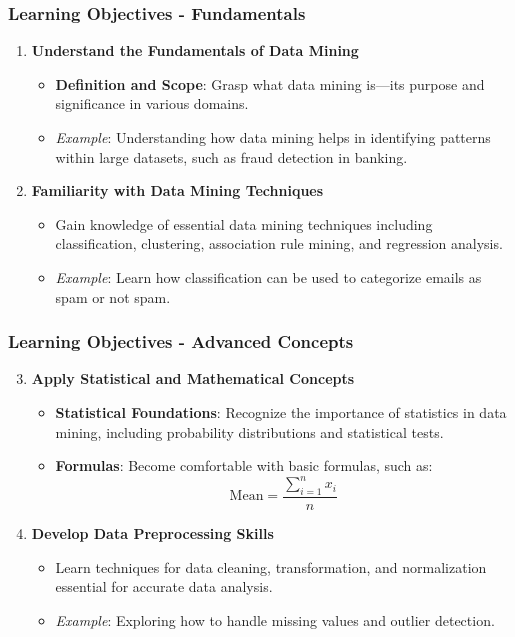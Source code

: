 \documentclass[aspectratio=169]{beamer}
\begin{document}
\begin{frame}[fragile]
    \frametitle{Learning Objectives - Fundamentals}
    \begin{enumerate}
        \item \textbf{Understand the Fundamentals of Data Mining}
        \begin{itemize}
            \item \textbf{Definition and Scope}: Grasp what data mining is—its purpose and significance in various domains.
            \item \textit{Example}: Understanding how data mining helps in identifying patterns within large datasets, such as fraud detection in banking.
        \end{itemize}
        
        \item \textbf{Familiarity with Data Mining Techniques}
        \begin{itemize}
            \item Gain knowledge of essential data mining techniques including classification, clustering, association rule mining, and regression analysis.
            \item \textit{Example}: Learn how classification can be used to categorize emails as spam or not spam.
        \end{itemize}
    \end{enumerate}
\end{frame}

\begin{frame}[fragile]
    \frametitle{Learning Objectives - Advanced Concepts}
    \begin{enumerate}
        \setcounter{enumi}{2} %
        \item \textbf{Apply Statistical and Mathematical Concepts}
        \begin{itemize}
            \item \textbf{Statistical Foundations}: Recognize the importance of statistics in data mining, including probability distributions and statistical tests.
            \item \textbf{Formulas}: Become comfortable with basic formulas, such as:
            \begin{equation}
            \text{Mean} = \frac{\sum_{i=1}^{n} x_i}{n}
            \end{equation}
            \end{itemize}

        \item \textbf{Develop Data Preprocessing Skills}
        \begin{itemize}
            \item Learn techniques for data cleaning, transformation, and normalization essential for accurate data analysis.
            \item \textit{Example}: Exploring how to handle missing values and outlier detection.
        \end{itemize}
    \end{enumerate}
\end{frame}
\end{document}
